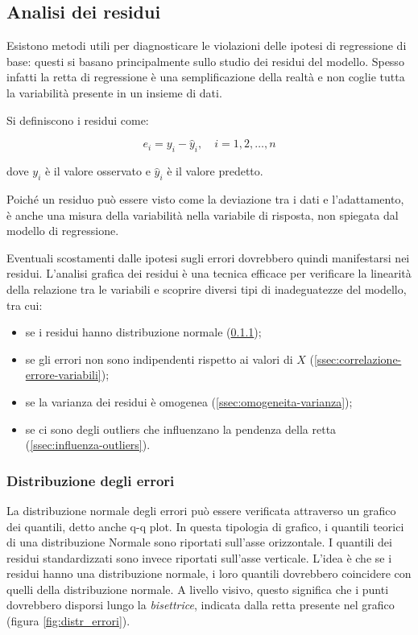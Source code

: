 \subsection{Analisi dei residui}\label{ssec:regressione-residui}
Esistono metodi utili per diagnosticare le violazioni delle ipotesi di regressione di base: questi si basano principalmente sullo studio dei residui del modello. Spesso infatti la retta di regressione è una semplificazione della realtà e non coglie tutta la variabilità presente in un insieme di dati. \cite{residui_pozzolo}

Si definiscono i residui come:

$$e_{i}=y_{i}-\hat{y}_{i}, \quad i=1,2, \ldots, n$$\smallskip

dove $y_{i}$ è il valore osservato e $\hat{y}_{i}$ è il valore predetto.

Poiché un residuo può essere visto come la deviazione tra i dati e l'adattamento, è anche una misura della variabilità nella variabile di risposta, non spiegata dal modello di regressione. \cite{introduction_to_lr}

Eventuali scostamenti dalle ipotesi sugli errori dovrebbero quindi manifestarsi nei residui. L'analisi grafica dei residui è una tecnica efficace per verificare la linearità della relazione tra le variabili e  scoprire diversi tipi di inadeguatezze del modello, tra cui: 
\begin{itemize}
  \item se i residui hanno distribuzione normale (\ref{ssec:distr-errori});
  \item se gli errori non sono indipendenti rispetto ai valori di $X$ (\ref{ssec:correlazione-errore-variabili});
  \item se la varianza dei residui è omogenea (\ref{ssec:omogeneita-varianza});
  \item se ci sono degli outliers che influenzano la pendenza della retta (\ref{ssec:influenza-outliers}).
\end{itemize}

\subsubsection{Distribuzione degli errori}\label{ssec:distr-errori}
La distribuzione normale degli errori può essere verificata attraverso un grafico dei quantili, detto anche q-q plot.
In questa tipologia di grafico, i quantili teorici di una distribuzione Normale sono riportati sull’asse orizzontale. I quantili dei residui standardizzati sono invece riportati sull’asse verticale.
L’idea è che se i residui hanno una distribuzione normale, i loro quantili dovrebbero coincidere con quelli della distribuzione normale. A livello visivo, questo significa che i punti dovrebbero disporsi lungo la \textit{bisettrice}, indicata dalla retta presente nel grafico (figura \ref{fig:distr_errori}).

